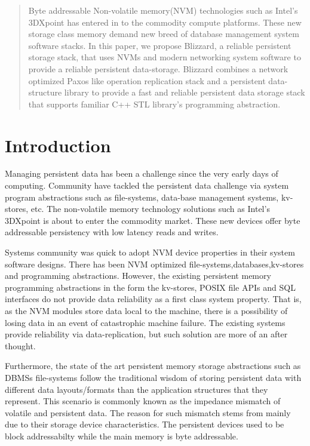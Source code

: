 \begin{abstract}
	Byte addressable Non-volatile memory(NVM) technologies such as Intel's
	3DXpoint has entered in to the commodity compute platforms. These
	new storage class memory demand new breed of database management system 
	software stacks. 
	In this paper, we propose Blizzard, a reliable persistent storage stack,
	that uses NVMs and modern networking system software to provide a reliable
	persistent data-storage. Blizzard combines a network optimized Paxos like 
	operation replication stack and a persistent data-structure library to 
	provide a fast and reliable persistent data storage stack that supports
	familiar C++ STL library's programming abstraction.

\end{abstract}

\section{Introduction}

Managing persistent data has been a challenge since the very early days of computing.
Community have tackled the persistent data challenge via system program abstractions
such as file-systems, data-base management systems, kv-stores, etc.
The non-volatile memory technology solutions such as Intel's 3DXpoint is about to
enter the commodity market. These new devices offer byte addressable persistency
with low latency reads and writes.

Systems community was quick to adopt NVM device properties in their system software
designs. There has been NVM optimized file-systems,databases,kv-stores and programming abstractions.
However, the existing persistent memory programming abstractions in the form the kv-stores, POSIX 
file APIs and SQL interfaces do not provide data reliability as a first class system
property. That is, as the NVM modules store data local to the machine, there is a possibility of 
losing data in an event of catastrophic machine failure. The existing systems provide reliability
via data-replication, but such solution are more of an after thought.

Furthermore, the state of the art persistent memory storage abstractions such as DBMSs file-systems
follow the traditional wisdom of storing persistent data with different data layouts/formats
than the application structures that they represent. This scenario is commonly known as 
the impedance mismatch of volatile and persistent data. The reason for such mismatch stems 
from mainly due to their storage device characteristics. The persistent devices used to be
block addressabilty while the main memory is byte addressable.

